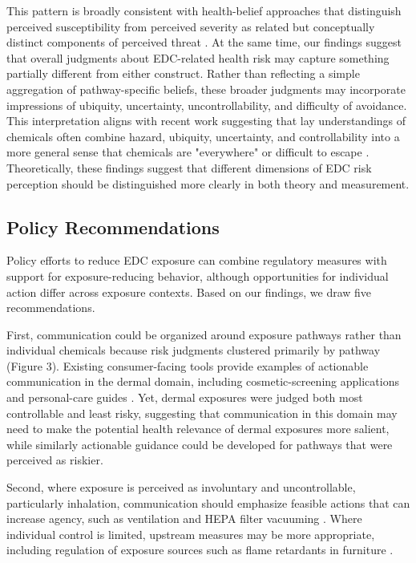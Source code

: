 This pattern is broadly consistent with health-belief approaches that distinguish perceived susceptibility from perceived severity as related but conceptually distinct components of perceived threat \citep{rosenstock1974historical, janz1984health}. At the same time, our findings suggest that overall judgments about EDC-related health risk may capture something partially different from either construct. Rather than reflecting a simple aggregation of pathway-specific beliefs, these broader judgments may incorporate impressions of ubiquity, uncertainty, uncontrollability, and difficulty of avoidance. This interpretation aligns with recent work suggesting that lay understandings of chemicals often combine hazard, ubiquity, uncertainty, and controllability into a more general sense that chemicals are "everywhere" or difficult to escape \citep{bearth2019lay, saleh2019chemophobia, boronow2025people}. Theoretically, these findings suggest that different dimensions of EDC risk perception should be distinguished more clearly in both theory and measurement.

\subsection{Policy Recommendations}

Policy efforts to reduce EDC exposure can combine regulatory measures with support for exposure-reducing behavior, although opportunities for individual action differ across exposure contexts. Based on our findings, we draw five recommendations.

First, communication could be organized around exposure pathways rather than individual chemicals because risk judgments clustered primarily by pathway (Figure 3). Existing consumer-facing tools provide examples of actionable communication in the dermal domain, including cosmetic-screening applications and personal-care guides \citep{forbrugerraadet_kemiluppen,bcpp_personalcare}. Yet, dermal exposures were judged both most controllable and least risky, suggesting that communication in this domain may need to make the potential health relevance of dermal exposures more salient, while similarly actionable guidance could be developed for pathways that were perceived as riskier.

Second, where exposure is perceived as involuntary and uncontrollable, particularly inhalation, communication should emphasize feasible actions that can increase agency, such as ventilation and HEPA filter vacuuming \citep{feldscher2026chemicals}. Where individual control is limited, upstream measures may be more appropriate, including regulation of exposure sources such as flame retardants in furniture \citep{volz2025proposal}.

